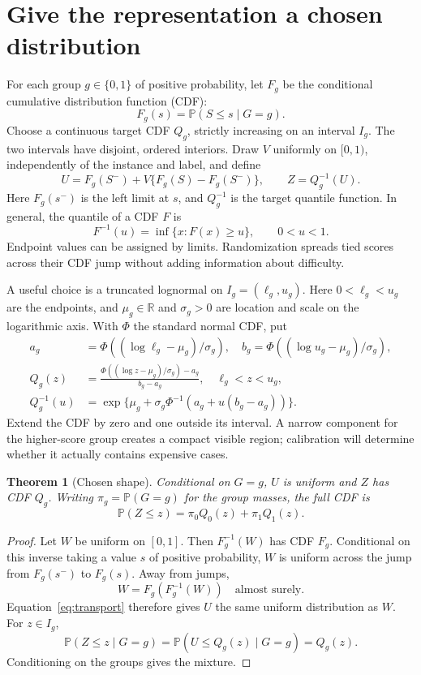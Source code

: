 \documentclass[10pt,letterpaper]{article}
\newtheorem{theorem}{Theorem}
\newcommand{\Prb}{\mathbb P}
\begin{document}
\section{Give the representation a chosen distribution}
For each group $g\in\{0,1\}$ of positive probability, let $F_g$ be the conditional cumulative distribution function (CDF):
\[
 F_g(s)=\Prb(S\le s\mid G=g).
\]
Choose a continuous target CDF $Q_g$, strictly increasing on an interval $I_g$. The two intervals have disjoint, ordered interiors. Draw $V$ uniformly on $[0,1)$, independently of the instance and label, and define
\begin{equation}\label{eq:transport}
 U=F_g(S^-)+V\{F_g(S)-F_g(S^-)\},\qquad Z=Q_g^{-1}(U).
\end{equation}
Here $F_g(s^-)$ is the left limit at $s$, and $Q_g^{-1}$ is the target quantile function. In general, the quantile of a CDF $F$ is
\[
 F^{-1}(u)=\inf\{x:F(x)\ge u\},\qquad 0<u<1.
\]
Endpoint values can be assigned by limits. Randomization spreads tied scores across their CDF jump without adding information about difficulty.

A useful choice is a truncated lognormal on $I_g=(\ell_g,u_g)$. Here $0<\ell_g<u_g$ are the endpoints, and $\mu_g\in\mathbb R$ and $\sigma_g>0$ are location and scale on the logarithmic axis. With $\Phi$ the standard normal CDF, put
\begin{align}
 a_g&=\Phi((\log\ell_g-\mu_g)/\sigma_g),\quad
 b_g=\Phi((\log u_g-\mu_g)/\sigma_g),\nonumber\\
 Q_g(z)&=\frac{\Phi((\log z-\mu_g)/\sigma_g)-a_g}{b_g-a_g},\quad \ell_g<z<u_g,
 \label{eq:lognormal}\\
 Q_g^{-1}(u)&=\exp\{\mu_g+\sigma_g\Phi^{-1}(a_g+u(b_g-a_g))\}.\nonumber
\end{align}
Extend the CDF by zero and one outside its interval. A narrow component for the higher-score group creates a compact visible region; calibration will determine whether it actually contains expensive cases.

\begin{theorem}[Chosen shape]\label{thm:shape}
Conditional on $G=g$, $U$ is uniform and $Z$ has CDF $Q_g$. Writing $\pi_g=\Prb(G=g)$ for the group masses, the full CDF is
\[
 \Prb(Z\le z)=\pi_0Q_0(z)+\pi_1Q_1(z).
\]
\end{theorem}
\begin{proof}
Let $W$ be uniform on $[0,1]$. Then $F_g^{-1}(W)$ has CDF $F_g$. Conditional on this inverse taking a value $s$ of positive probability, $W$ is uniform across the jump from $F_g(s^-)$ to $F_g(s)$. Away from jumps,
\[
 W=F_g(F_g^{-1}(W))\quad\text{almost surely}.
\]
Equation~\eqref{eq:transport} therefore gives $U$ the same uniform distribution as $W$. For $z\in I_g$,
\[
 \Prb(Z\le z\mid G=g)
 =\Prb(U\le Q_g(z)\mid G=g)=Q_g(z).
\]
Conditioning on the groups gives the mixture.
\end{proof}
\end{document}
